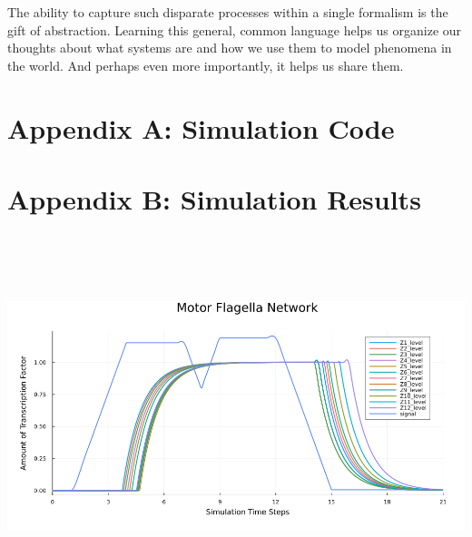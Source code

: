 \documentclass[12pt]{article}
\begin{document}
The ability to capture such disparate processes within a single formalism is the gift of abstraction.
Learning this general, common language helps us organize our thoughts about what systems are and how we use them to model phenomena in the world.
And perhaps even more importantly, it helps us share them.




\nocite{*}

\pagebreak



\pagebreak
\section*{Appendix A: Simulation Code}

\pagebreak
\section*{Appendix B: Simulation Results}
\includegraphics[width=650px, height=400px, angle=270]{motor_flagella.png}
\end{document}
